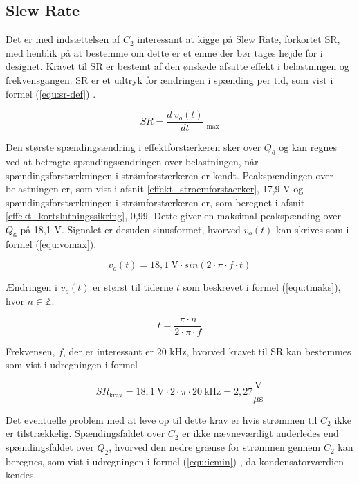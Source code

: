 \subsection{Slew Rate}
\label{effekt_slewrate}
Det er med indsættelsen af $C_2$ interessant at kigge på Slew Rate, forkortet SR, med henblik på at bestemme om dette er et emne der bør tages højde for i designet. Kravet til SR er bestemt af den ønskede afsatte effekt i belastningen og frekvensgangen. SR er et udtryk for ændringen i spænding per tid, som vist i formel (\ref{equ:sr-def}) \cite{sedra-smith-11}.%

\begin{equation}
\label{equ:sr-def}
SR = \frac{d~v_o(t)}{dt} \Biggr\vert _\mathrm{max}
\end{equation}

Den største spændingsændring i effektforstærkeren sker over $Q_6$ og kan regnes ved at betragte spændingsændringen over belastningen, når spændingsforstærkningen i strømforstærkeren er kendt. Peakspændingen over belastningen er, som vist i afsnit \ref{effekt_stroemforstaerker}, 17,9 V og spændingsforstærkningen i strømforstærkeren er, som beregnet i afsnit \ref{effekt_kortslutningssikring}, 0,99. Dette giver en maksimal peakspænding over $Q_6$ på 18,1 V. Signalet er desuden sinusformet, hvorved $v_o(t)$ kan skrives som i formel (\ref{equ:vomax}).

\begin{equation}
\label{equ:vomax}
v_o(t) = 18,1~\mathrm{V} \cdot sin\left( 2 \cdot \pi \cdot f \cdot t \right) 
\end{equation}

Ændringen i $v_o(t)$ er størst til tiderne $t$ som beskrevet i formel (\ref{equ:tmaks}), hvor $n \in \mathbb{Z}$.

\begin{equation}
\label{equ:tmaks}
t = \frac{\pi \cdot n}{2 \cdot \pi \cdot f}
\end{equation}

Frekvensen, $f$, der er interessant er 20 kHz, hvorved kravet til SR kan bestemmes som vist i udregningen i formel 

\begin{equation}
\label{equ:}
SR_\mathrm{krav} = 18,1~\mathrm{V} \cdot 2 \cdot \pi \cdot 20~\mathrm{kHz} =  2,27\frac{\mathrm{V}}{\mu\mathrm{s}}
\end{equation}

Det eventuelle problem med at leve op til dette krav er hvis strømmen til $C_2$ ikke er tilstrækkelig. Spændingsfaldet over $C_2$ er ikke nævneværdigt anderledes end spændingsfaldet over $Q_2$, hvorved den nedre grænse for strømmen gennem $C_2$ kan beregnes, som vist i udregningen i formel (\ref{equ:icmin}) \cite{ael-mm20}%
, da kondensatorværdien kendes.

